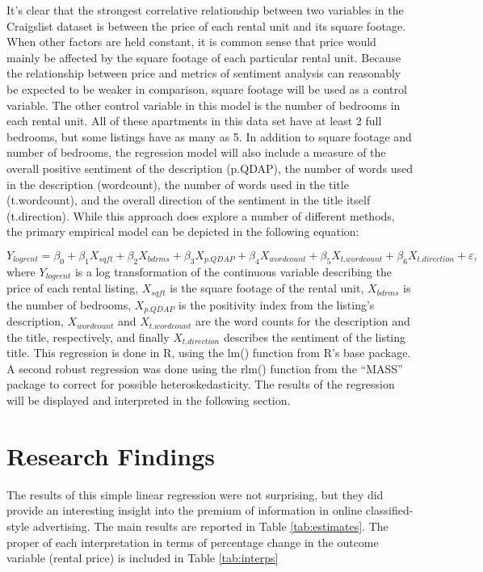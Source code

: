 \documentclass[12pt,english]{article}
\begin{document}
It’s clear that the strongest correlative relationship between two variables in the Craigslist dataset is between the price of each rental unit and its square footage. When other factors are held constant, it is common sense that price would mainly be affected by the square footage of each particular rental unit. Because the relationship between price and metrics of sentiment analysis can reasonably be expected to be weaker in comparison, square footage will be used as a control variable. The other control variable in this model is the number of bedrooms in each rental unit. All of these apartments in this data set have at least 2 full bedrooms, but some listings have as many as 5. In addition to square footage and number of bedrooms, the regression model will also include a measure of the overall positive sentiment of the description (p.QDAP), the number of words used in the description (wordcount), the number of words used in the title (t.wordcount), and the overall direction of the sentiment in the title itself (t.direction). While this approach does explore a number of different methods, the primary empirical model can be depicted in the following equation:

\begin{equation}
\label{eq:1}
Y_{logrent}=\beta_{0} + \beta_{1}X_{sqft} + \beta_{2} X_{bdrms} + \beta_{3}X_{p.QDAP} + \beta_{4}X_{wordcount} + \beta_{5}X_{t.wordcount}+\beta_{6}X_{t.direction} + \varepsilon,
\end{equation}
where $Y_{logrent}$ is a log transformation of the continuous variable describing the price of each rental listing, $X_{sqft}$ is the square footage of the rental unit, $X_{bdrms}$ is the number of bedrooms, $X_{p.QDAP}$ is the positivity index from the listing's description, $X_{wordcount}$ and $X_{t.wordcount}$ are the word counts for the description and the title, respectively, and finally $X_{t.direction}$ describes the sentiment of the listing title. This regression is done in R, using the lm() function from R’s base package. A second robust regression was done using the rlm() function from the “MASS” package to correct for possible heteroskedasticity. The results of the regression will be displayed and interpreted in the following section.

\section{Research Findings}\label{sec:results}

The results of this simple linear regression were not surprising, but they did provide an interesting insight into the premium of information in online classified-style advertising. The main results are reported in Table \ref{tab:estimates}. The proper of each interpretation in terms of percentage change in the outcome variable (rental price) is included in Table \ref{tab:interps}
\end{document}

